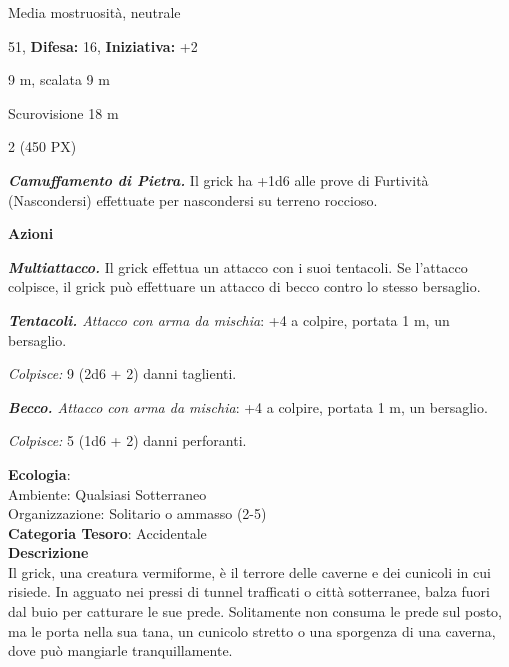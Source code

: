 \begin{multicols}{2}
{
\noindent
\begin{description}[noitemsep, topsep=0pt, parsep=0pt, partopsep=0pt, leftmargin=0cm, labelwidth=2.2cm]
	\item[\textbf{Taglia/Tipo:}] Media mostruosità, neutrale
	\item[\textbf{Caratt.:}] 
	\item[\textbf{Punti Ferita:}] 51,  \textbf{Difesa:} 16,  \textbf{Iniziativa:} +2
	\item[\textbf{Movimento:}] 9 m, scalata 9 m
	\item[\textbf{Tiri Salvez.:}] 
	\item[\textbf{Sensi:}] Scurovisione 18 m
	\item[\textbf{Sfida:}] 2 (450 PX)\smallskip
\end{description}

\emph{\textbf{Camuffamento di Pietra.}} Il grick ha +1d6 alle prove di Furtività (Nascondersi) effettuate per nascondersi su terreno roccioso.

\textbf{Azioni}

\emph{\textbf{Multiattacco.}} Il grick effettua un attacco con i suoi tentacoli. Se l'attacco colpisce, il grick può effettuare un attacco di becco contro lo stesso bersaglio.

\emph{\textbf{Tentacoli.} Attacco con arma da mischia}: +4 a colpire, portata 1 m, un bersaglio.

\emph{Colpisce:} 9 (2d6 + 2) danni taglienti.

\emph{\textbf{Becco.} Attacco con arma da mischia}: +4 a colpire, portata 1 m, un bersaglio.

\emph{Colpisce:} 5 (1d6 + 2) danni perforanti.

\textbf{Ecologia}: \\
Ambiente: Qualsiasi Sotterraneo\\
Organizzazione: Solitario o ammasso (2-5)\\
\textbf{Categoria Tesoro}: Accidentale\\
\textbf{Descrizione}\\
Il grick, una creatura vermiforme, è il terrore delle caverne e dei cunicoli in cui risiede. In agguato nei pressi di tunnel trafficati o città sotterranee, balza fuori dal buio per catturare le sue prede. Solitamente non consuma le prede sul posto, ma le porta nella sua tana, un cunicolo stretto o una sporgenza di una caverna, dove può mangiarle tranquillamente.

}
\end{multicols}
